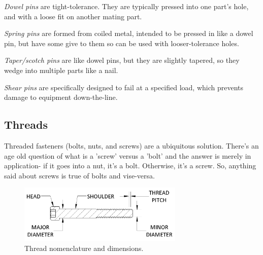 \documentclass[10pt,letterpaper]{book}
\begin{document}
	\begin{asparaenum}[a)]
		\item \textit{Dowel pins} are tight-tolerance. They are typically pressed into one part's hole, and with a loose fit on another mating part.
		\item \textit{Spring pins} are formed from coiled metal, intended to be pressed in like a dowel pin, but have some give to them so can be used with looser-tolerance holes.
		\item \textit{Taper/scotch pins} are like dowel pins, but they are slightly tapered, so they wedge into multiple parts like a nail.
		\item \textit{Shear pins} are specifically designed to fail at a specified load, which prevents damage to equipment down-the-line.
	\end{asparaenum}
	
	\subsection{Threads} \label{section:threads}
	
	Threaded fasteners (bolts, nuts, and screws) are a ubiquitous solution. There's an age old question of what is a 'screw' versus a 'bolt' and the answer is merely in application- if it goes into a nut, it's a bolt. Otherwise, it's a screw. So, anything said about screws is true of bolts and vise-versa.
	
	\begin{figure}[H]
		\includegraphics[width=0.7\textwidth]{imgs/thread_nomenclature.png}
		\caption{Thread nomenclature and dimensions.}
	\end{figure}
	
\end{document}
